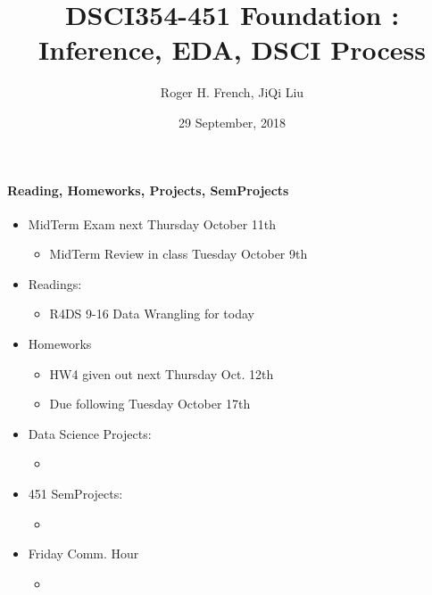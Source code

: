 \documentclass[]{article}
\title{DSCI354-451 Foundation : Inference, EDA, DSCI Process}
\author{Roger H. French, JiQi Liu}
\date{29 September, 2018}
\providecommand{\tightlist}{%
  \setlength{\itemsep}{0pt}\setlength{\parskip}{0pt}}
\let\oldparagraph\paragraph
\renewcommand{\paragraph}[1]{\oldparagraph{#1}\mbox{}}
\begin{document}
\maketitle

{
\hypersetup{linkcolor=black}
\setcounter{tocdepth}{6}
\tableofcontents
}
\setcounter{section}{6} \setcounter{subsection}{1}
\setcounter{subsubsection}{0}

\paragraph{Reading, Homeworks, Projects,
SemProjects}\label{reading-homeworks-projects-semprojects}

\begin{itemize}
\tightlist
\item
  MidTerm Exam next Thursday October 11th

  \begin{itemize}
  \tightlist
  \item
    MidTerm Review in class Tuesday October 9th
  \end{itemize}
\item
  Readings:

  \begin{itemize}
  \tightlist
  \item
    R4DS 9-16 Data Wrangling for today
  \end{itemize}
\item
  Homeworks

  \begin{itemize}
  \tightlist
  \item
    HW4 given out next Thursday Oct. 12th
  \item
    Due following Tuesday October 17th
  \end{itemize}
\item
  Data Science Projects:

  \begin{itemize}
  \item
  \end{itemize}
\item
  451 SemProjects:

  \begin{itemize}
  \item
  \end{itemize}
\item
  Friday Comm. Hour

  \begin{itemize}
  \item
  \end{itemize}
\end{itemize}
\end{document}
